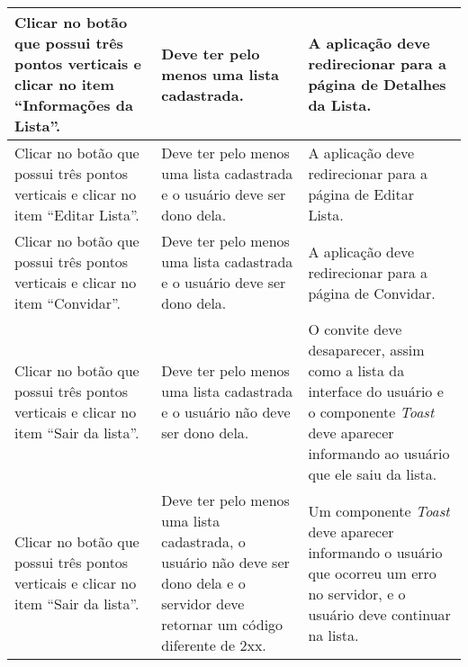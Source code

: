 \begin{quadro}[H]
\begin{tabular}{|p{5.0cm}|p{5.0cm}|p{4.5cm}|}
 	\hline
 	Clicar no botão que possui três pontos verticais e clicar no item ``Informações da Lista''. & Deve ter pelo menos uma lista cadastrada. & A aplicação deve redirecionar para a página de Detalhes da Lista.  \\ 
 	\hline
 	Clicar no botão que possui três pontos verticais e clicar no item ``Editar Lista''. & Deve ter pelo menos uma lista cadastrada e o usuário deve ser dono dela. & A aplicação deve redirecionar para a página de Editar Lista.  \\ 
 	\hline
 	Clicar no botão que possui três pontos verticais e clicar no item ``Convidar''. & Deve ter pelo menos uma lista cadastrada e o usuário deve ser dono dela. & A aplicação deve redirecionar para a página de Convidar.  \\ 
 	\hline
 	Clicar no botão que possui três pontos verticais e clicar no item ``Sair da lista''. & Deve ter pelo menos uma lista cadastrada e o usuário não deve ser dono dela. & O convite deve desaparecer, assim como a lista da interface do usuário e o componente \textit{Toast} deve aparecer informando ao usuário que ele saiu da lista.  \\ 
 	\hline
 	Clicar no botão que possui três pontos verticais e clicar no item ``Sair da lista''. & Deve ter pelo menos uma lista cadastrada, o usuário não deve ser dono dela e o servidor deve retornar um código diferente de 2xx. & Um componente \textit{Toast} deve aparecer informando o usuário que ocorreu um erro no servidor, e o usuário deve continuar na lista.  \\ 
 	\hline
\end{tabular}
\end{quadro}

